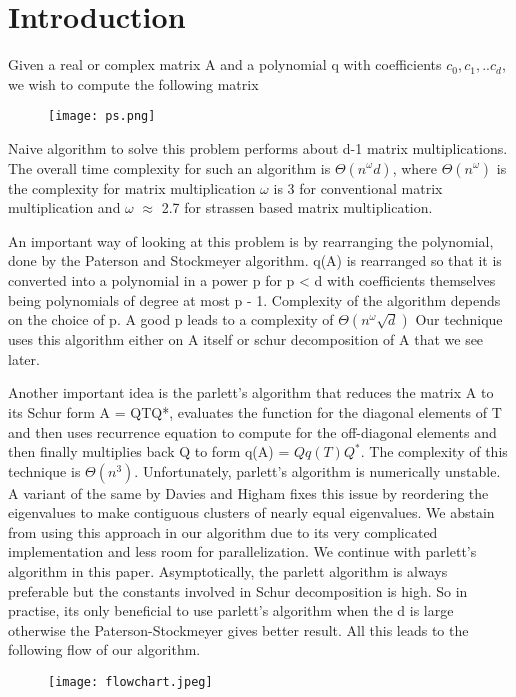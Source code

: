 \documentclass{article}
\begin{document}
\section{Introduction}
Given a real or complex matrix A and a polynomial q with coefficients $c_0,c_1,..c_d$, we wish to compute the following matrix 
\begin{figure}[H]
 \texttt{[image: ps.png]}
\end{figure}
Naive algorithm to solve this problem performs about d-1 matrix multiplications. The overall time complexity for such an algorithm is $\Theta(n^{\omega}d)$, where $\Theta(n^{\omega})$ is the complexity for matrix multiplication $\omega$ is 3 for conventional matrix multiplication and $\omega$ $\approx$ 2.7 for strassen based matrix multiplication. \par
An important way of looking at this problem is by rearranging the polynomial, done by the Paterson and Stockmeyer algorithm. q(A) is rearranged so that it is converted into a polynomial in a power p for p < d with coefficients themselves being polynomials of degree at most p - 1. Complexity of the algorithm depends on the choice of p. A good p leads to a complexity of $\Theta(n^{\omega}\sqrt{d})$ Our technique uses this algorithm either on A itself or schur decomposition of A that we see later. \par
Another important idea is the parlett's algorithm that reduces the matrix A to its Schur form A = QTQ*, evaluates the function for the diagonal elements of T and then uses recurrence equation to compute for the off-diagonal elements and then finally multiplies back Q to form q(A) = $Qq(T)Q^*$. The complexity of this technique is $\Theta(n^{3})$. Unfortunately, parlett's algorithm is numerically unstable. A variant of the same by Davies and Higham fixes this issue by reordering the eigenvalues to make contiguous clusters of nearly equal eigenvalues. We abstain from using this approach in our algorithm due to its very complicated implementation and less room for parallelization. We continue with parlett's algorithm in this paper.  
Asymptotically, the parlett algorithm is always preferable but the constants involved in Schur decomposition is high. So in practise, its only beneficial to use parlett's algorithm when the d is large otherwise the Paterson-Stockmeyer gives better result. All this leads to the following flow of our algorithm.

\begin{figure}[H]
 \centering
 \texttt{[image: flowchart.jpeg]}
\end{figure}
\end{document}
